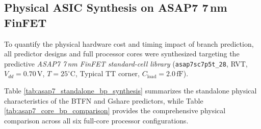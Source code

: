\subsection{Physical ASIC Synthesis on ASAP7 7\,nm FinFET}

To quantify the physical hardware cost and timing impact of branch prediction, all predictor designs and full processor cores were synthesized targeting the predictive \textit{ASAP7 7\,nm FinFET standard-cell library} (\texttt{asap7sc7p5t\_28}, RVT, $V_{dd} = 0.70\,\text{V}$, $T = 25^\circ\text{C}$, Typical TT corner, $C_{\text{load}} = 2.0\,\text{fF}$).

Table \ref{tab:asap7_standalone_bp_synthesis} summarizes the standalone physical characteristics of the BTFN and Gshare predictors, while Table \ref{tab:asap7_core_bp_comparison} provides the comprehensive physical comparison across all six full-core processor configurations.

\begin{table}[htbp]
\centering
{}
\caption{Physical ASIC synthesis comparison of standalone branch predictors in ASAP7 7\,nm FinFET technology.}\label{tab:asap7_standalone_bp_synthesis}
\end{table}


